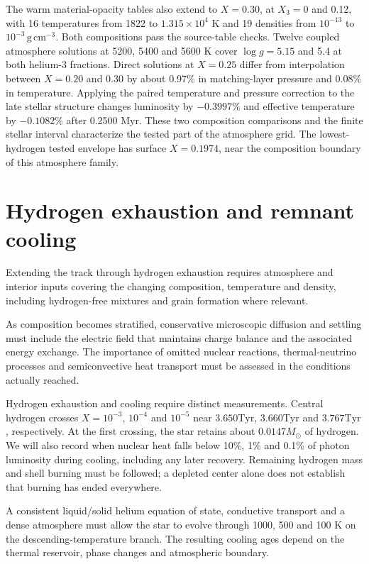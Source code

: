 \documentclass[11pt,letterpaper]{article}
\newcommand{\Ms}{M_\odot}\newcommand{\Rs}{R_\odot}\newcommand{\Ls}{L_\odot}
\newcommand{\Tyr}{\mathrm{Tyr}}
\begin{document}
The warm material-opacity tables also extend to $X=0.30$, at
$X_3=0$ and 0.12, with 16 temperatures from 1822 to
$1.315\times10^4$ K and 19 densities from $10^{-13}$ to
$10^{-3}\,\mathrm{g\,cm^{-3}}$. Both compositions pass the source-table
checks. Twelve coupled atmosphere solutions at 5200, 5400 and 5600 K
cover $\log g=5.15$ and 5.4 at both helium-3 fractions. Direct solutions
at $X=0.25$ differ from interpolation between $X=0.20$ and 0.30 by
about 0.97\% in matching-layer pressure and 0.08\% in temperature.
Applying the paired temperature and pressure correction to the late stellar
structure changes luminosity by $-0.3997\%$ and effective temperature by
$-0.1082\%$ after 0.2500 Myr. These two composition comparisons and the
finite stellar interval characterize the tested part of the atmosphere grid.
The lowest-hydrogen tested envelope has surface $X=0.1974$, near the
composition boundary of this atmosphere family.

\section{Hydrogen exhaustion and remnant cooling}
Extending the track through hydrogen exhaustion requires atmosphere and
interior inputs covering the changing composition, temperature and density,
including hydrogen-free mixtures and grain formation where relevant.

As composition becomes stratified, conservative microscopic diffusion and
settling must include the electric field that maintains charge balance and
the associated energy exchange. The importance of omitted nuclear reactions,
thermal-neutrino processes and semiconvective heat transport must be assessed
in the conditions actually reached.

Hydrogen exhaustion and cooling require distinct measurements. Central
hydrogen crosses $X=10^{-3}$, $10^{-4}$ and $10^{-5}$ near
$3.650\Tyr$, $3.660\Tyr$ and $3.767\Tyr$, respectively. At the first
crossing, the star retains about $0.0147\Ms$ of hydrogen.
We will also record when nuclear heat
falls below 10\%, 1\% and 0.1\% of photon luminosity during cooling, including
any later recovery. Remaining hydrogen mass and shell burning must be followed;
a depleted center alone does not establish that burning has ended everywhere.

A consistent liquid/solid helium equation of state, conductive
transport and a dense atmosphere must allow the star to evolve through
1000, 500 and 100 K on the descending-temperature branch.
The resulting cooling ages depend on the thermal reservoir, phase changes
and atmospheric boundary.
\end{document}
